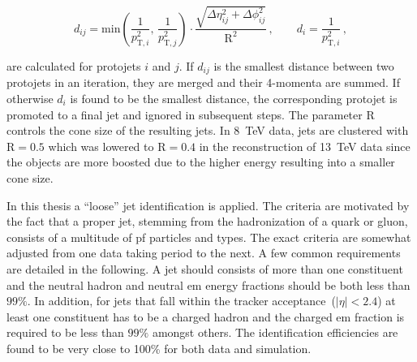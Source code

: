 \begin{equation}
d_{ij}=\mathrm{min}\left(\frac{1}{p_{\mathrm{T},i}^{2}},\,\frac{1}{p_{\mathrm{T},j}^{2}}\right)\cdot\frac{\sqrt{\Delta\eta_{ij}^{2}+\Delta\phi_{ij}^{2}}}{\mathrm{R}^2}\,,\qquad d_{i}=\frac{1}{p_{\mathrm{T},i}^{2}}\,,
\end{equation}

are calculated for protojets $i$ and $j$.  If $d_{ij}$ is the smallest distance between two protojets in an iteration, they are merged and their 4-momenta are summed. If otherwise $d_{i}$ is found to be the smallest distance, the corresponding protojet is promoted to a final jet and ignored in subsequent steps. The parameter $\mathrm{R}$ controls the cone size of the resulting jets. In 8~TeV data, jets are clustered with $\mathrm{R}=0.5$ which was lowered to $\mathrm{R}=0.4$ in the reconstruction of 13~TeV data since the objects are more boosted due to the higher energy resulting into a smaller cone size.

In this thesis a ``loose'' jet identification is applied. The criteria are motivated by the fact that a proper jet, stemming from the hadronization of a quark or gluon, consists of a multitude of \gls{pf} particles and types. The exact criteria are somewhat adjusted from one data taking period to the next. A few common requirements are detailed in the following. A jet should consists of more than one constituent and the neutral hadron and neutral \gls{em} energy fractions should be both less than $99\%$. In addition, for jets that fall within the tracker acceptance~($|\eta|<2.4$) at least one constituent has to be a charged hadron and the charged \gls{em} fraction is required to be less than $99\%$ amongst others. The identification efficiencies are found to be very close to 100\% for both data and simulation.

